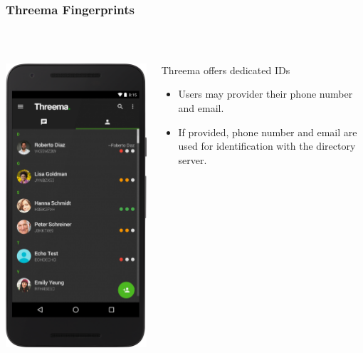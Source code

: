 \documentclass[
	aspectratio=169,
	xetex,
]{beamer}
\newcounter{i}
\begin{document}
\begin{frame}
	\frametitle{Threema Fingerprints}
	\-\\[-.1em]
	\begin{columns}
		\begin{column}{.3\textwidth}
			\includegraphics[height=.9\textheight]{img/android-nexus5x-2.6-us_en-dark-10-contacts-portrait-deviceart.png}
		\end{column}
		\begin{column}{.7\textwidth}
			Threema offers dedicated IDs		
			\begin{itemize}
				\item Users \alert{may} provider their phone number and email.
				\item If provided, phone number and email are used for identification with the directory server.

\end{itemize}
\end{column}
\end{columns}
\end{frame}
\end{document}
